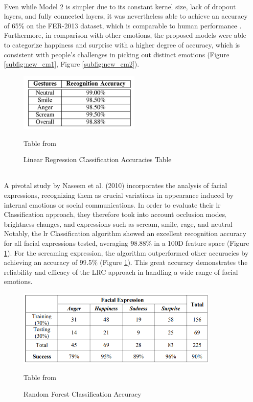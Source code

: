 \\
\indent Even while Model 2 is simpler due to its constant kernel size, lack of dropout layers, and fully connected layers, it was nevertheless able to achieve an accuracy of 65\% on the FER-2013 dataset, which is comparable to human performance \citep{agrawal_2019_using}.
Furthermore, in comparison with other emotions, the proposed models were able to categorize happiness and surprise with a higher degree of accuracy, which is consistent with people's challenges in picking out distinct emotions (Figure \ref{subfig:new_cm1}, Figure \ref{subfig:new_cm2}).
\\
\begin{figure}[!ht]
    \centering
    \includegraphics[width=6cm]{Images/lr_result.png}
    \caption{Linear Regression Classification Accuracies Table} \footnotesize{Table from \citep{naseem_2010_linear}}
    \label{fig:lrc_result}
\end{figure}
\\
\indent A pivotal study by Naseem et al. (2010) incorporates the analysis of facial expressions, recognizing them as crucial variations in appearance induced by internal emotions or social communications.
In order to evaluate their \gls{lr} Classification approach, they therefore took into account occlusion modes, brightness changes, and expressions such as scream, smile, rage, and neutral
Notably, the \gls{lr} Classification algorithm showed an excellent recognition accuracy for all facial expressions tested, averaging 98.88\% in a 100D feature space (Figure \ref{fig:lrc_result}). 
For the screaming expression, the algorithm outperformed other accuracies by achieving an accuracy of 99.5\% (Figure \ref{fig:lrc_result}).
This great accuracy demonstrates the reliability and efficacy of the LRC approach in handling a wide range of facial emotions.
\\
\begin{figure}[!ht]
    \centering
    \includegraphics[width=10cm]{Images/rf_result.png}
    \caption{Random Forest Classification Accuracy} \footnotesize{Table from \citep{munasinghe_2018_facial}}
    \label{fig:rf_result}
\end{figure}

